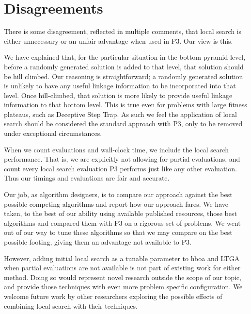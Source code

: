 \documentclass[]{article}
\begin{document}
\section{Disagreements}

There is some disagreement, reflected in multiple comments, that local search is either unnecessary or an unfair advantage when used in P3. Our view is this.

We have explained that, for the particular situation in the bottom pyramid level,
before a randomly generated solution is added to that level, that solution should be hill climbed.
Our reasoning is straightforward; a randomly generated solution is unlikely to
have any useful linkage information to be incorporated into that level.
Once hill-climbed, that solution is more likely to provide useful linkage information to that bottom level.
This is true even for problems with large fitness plateaus, such as Deceptive Step Trap.
As such we feel the application of local search should be considered the standard approach
with P3, only to be removed under exceptional circumstances.

When we count evaluations and wall-clock time, we include the local search performance. That is, we are explicitly not allowing for partial evaluations, and count every local search evaluation P3 performs just like any other evaluation. Thus our timings and evaluations are fair and accurate.

Our job, as algorithm designers, is to compare our approach against the best possible competing algorithms
and report how our approach fares. We have taken, to the best of our ability using available published resources,
those best algorithms and compared them with P3 on a rigorous set of problems.
We went out of our way to tune these algorithms
so that we may compare on the best possible footing, giving them an advantage not available to P3.

However, adding initial local search as a tunable parameter to hboa and LTGA when partial evaluations are not available is not part
of existing work for either method. Doing so would represent novel research outside the scope of our topic, and provide those techniques
with even more problem specific configuration. We welcome future work by other researchers exploring the possible effects of combining
local search with their techniques.
\end{document}
